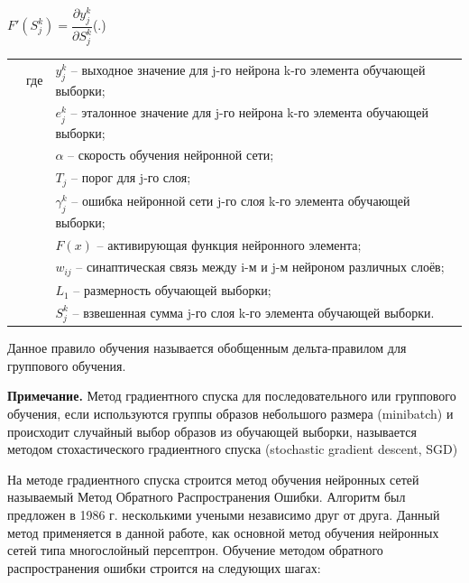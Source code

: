 {		\formulaspace \par \redline 
	$ F'(S_{j}^{k}) = \dfrac{\partial y_{j}^{k}}{\partial S_{j}^{k}} $\hfill (\thechaptercntr .\theformulacntr) \redline
	\formulaspace \addtocounter{formulacntr}{1}
	
	\begin{tabular}{p{}p{}p{}}
		& где  & $y_{j}^{k}$ {--} выходное значение для j-го нейрона k-го элемента обучающей выборки; \\
		&      & $e_{j}^{k}$ {--} эталонное значение для j-го нейрона k-го элемента обучающей выборки; \\
		&      & $\alpha$ {--} скорость обучения нейронной сети; \\
		&      & $T_{j}$ {--} порог для j-го слоя; \\
		&      & $\gamma_{j}^{k}$ {--} ошибка нейронной сети j-го слоя k-го элемента обучающей выборки; \\
		&      & $F(x)$ {--} активирующая функция нейронного элемента; \\
		&      & $w_{ij}$ {--} синаптическая связь между i-м и j-м нейроном различных слоёв; \\
		&      & $L_1$ {--} размерность обучающей выборки; \\
		&      & $S_{j}^{k}$ {--} взвешенная сумма j-го слоя k-го элемента обучающей выборки. \\
	\end{tabular}
	
	\par \redline Данное правило обучения называется обобщенным дельта-правилом для группового обучения.
	
	\par \redline \textbf{Примечание.} Метод градиентного спуска для последовательного или группового обучения, если используются группы образов небольшого размера (minibatch) и происходит случайный выбор образов из обучающей выборки, называется методом стохастического градиентного спуска (stochastic gradient descent, SGD)
	
	\par \redline На методе градиентного спуска строится метод обучения нейронных сетей называемый Метод Обратного Распространения Ошибки. Алгоритм был предложен в 1986 г. несколькими учеными независимо друг от друга. Данный метод применяется в данной работе, как основной метод обучения нейронных сетей типа многослойный персептрон. Обучение методом обратного распространения ошибки строится на следующих шагах:
	
}
